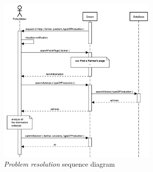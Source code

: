 \begin{enumerate}
\begin{figure}[H]
\begin{center}
        \includegraphics[width=0.7\textwidth]{sequence/replyHelp.png}
        \caption{\emph{Problem resolution} sequence diagram}
        \label{fig:sequence13}
        \end{center}
    \end{figure}
\end{enumerate}

